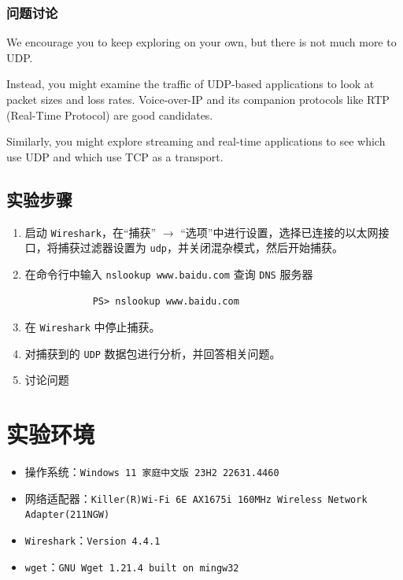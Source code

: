 \documentclass{article}
\begin{document}
	\subsubsection{问题讨论}
	
	We encourage you to keep exploring on your own, but there is not much more to UDP. 
	
	Instead, you might examine the traffic of UDP-based applications to look at packet sizes and loss rates. Voice-over-IP and its companion protocols like RTP (Real-Time Protocol) are good candidates. 
	
	Similarly, you might explore streaming and real-time applications to see which use UDP and which use TCP as a transport.
	
	\subsection{实验步骤}
	
	\begin{enumerate}[noitemsep, label={{\arabic*})}]
		\item 启动 \texttt{Wireshark}，在“捕获” $\to$ “选项”中进行设置，选择已连接的以太网接口，将捕获过滤器设置为 \texttt{udp}，并关闭混杂模式，然后开始捕获。
		\item 在命令行中输入 \texttt{nslookup www.baidu.com} 查询 \texttt{DNS} 服务器
		
		\begin{lstlisting}
			PS> nslookup www.baidu.com
		\end{lstlisting}
		\item 在 \texttt{Wireshark} 中停止捕获。
		\item 对捕获到的 \texttt{UDP} 数据包进行分析，并回答相关问题。
		\item 讨论问题
	\end{enumerate}
	
	\section{实验环境}
	
	\begin{itemize}[noitemsep]
		\item 操作系统：\texttt{Windows 11 家庭中文版 23H2 22631.4460}
		\item 网络适配器：\texttt{Killer(R)Wi-Fi 6E AX1675i 160MHz Wireless Network Adapter(211NGW)}
		\item \texttt{Wireshark}：\texttt{Version 4.4.1}
		\item \texttt{wget}：\texttt{GNU Wget 1.21.4 built on mingw32}
	\end{itemize}
	
\end{document}
